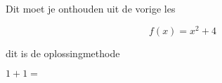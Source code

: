 \documentclass{ximera}
\begin{document}

\begin{template}
    Dit moet je onthouden uit de vorige les
\end{template}

\begin{exercise}
    \[f(x)=x^2+4\]
    \begin{oplossing}
        dit is de oplossingmethode
    \end{oplossing}
\end{exercise}

\begin{exercise}
    $1+1=$
\end{exercise}
\end{document}
